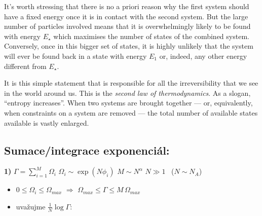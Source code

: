 \begin{minipage}{0.55\textwidth}
\end{minipage}
\begin{minipage}{0.43\textwidth}
\small It's worth stressing that there is no a priori reason why the first system should have a fixed energy once it is in contact with the second system. But the large number of particles involved means that it is overwhelmingly likely to be found with energy $E_\star$ which maximises the number of states of the combined system. Conversely, once in this bigger set of states, it is highly unlikely that the system will ever be found back in a state with energy $E_1$ or, indeed, any other energy different from $E_\star$.

It is this simple statement that is responsible for all the irreversibility that we see in the world around us. This is the \emph{second law of thermodynamics}. As a slogan, ``entropy increases''. When two systems are brought together --- or, equivalently, when constraints on a system are removed --- the total number of available states available is vastly enlarged.
\end{minipage}

\subsection*{\textcolor{NavyBlue}{Sumace/integrace exponenciál:}}
{\color{NavyBlue}
\textbf{1)} \quad $\Gamma = \displaystyle\sum_{i=1}^{M}\Omega_i$ \qquad $\Omega_i\sim\exp(N\phi_i)$ \qquad $M\sim N^\alpha$ \qquad $N\gg 1$ \ ($N\sim N_A$)
\begin{itemize}
  \item $0\leq\Omega_i\leq\Omega_{max}$ \quad $\Rightarrow$ \quad $\Omega_{max}\leq\Gamma\leq M\,\Omega_{max}$
  \item uvažujme $\frac1N\log\Gamma$:
\end{itemize}
}

